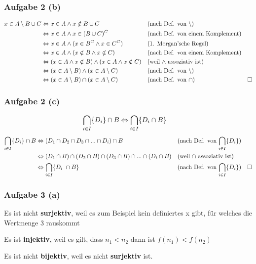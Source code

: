\documentclass[a4paper, 10pt]{scrartcl}
\begin{document}
\subsubsection*{Aufgabe 2 \small(b)}
\begin{align}
    x \in A \setminus B \cup C &\Leftrightarrow x \in A \wedge x \notin B \cup C \notag && \textrm{(nach Def. von $\setminus$)}\\
    &\Leftrightarrow x \in A \wedge x \in  (B \cup C)^C \notag  && \textrm{(nach Def. von einem Komplement)}\\
    &\Leftrightarrow x \in A \wedge (x \in B^C \wedge x \in C^C) \notag  && \textrm{(1. Morgan'sche Regel)} \\
    &\Leftrightarrow x \in A \wedge (x \notin B \wedge x \notin C) \notag  && \textrm{(nach Def. von einem Komplement)} \\
    &\Leftrightarrow (x \in A \wedge x \notin B) \wedge (x \in A \wedge x \notin C) \notag  && \textrm{(weil $\wedge$ assoziativ ist)}\\
    &\Leftrightarrow (x \in A \setminus B) \wedge (x \in A \setminus C) \notag  && \textrm{(nach Def. von $\setminus$)}\\
    &\Leftrightarrow (x \in A \setminus B) \cap (x \in A \setminus C) \notag && \textrm{(nach Def. von $\cap$)} & \Box
\end{align}

\subsubsection*{Aufgabe 2 \small(c)}
\begin{align}
    \bigcap_{i \in I}\{D_i\} \cap B &\Leftrightarrow \bigcap_{i \in I}\{D_i \cap B\} \notag 
\end{align}
\begin{align}
    \bigcap_{i \in I}\{D_i\} \cap B &\Leftrightarrow (D_1 \cap D_2 \cap D_3 \cap ... \cap D_i) \cap B \notag  && \textrm{(nach Def. von $\bigcap_{i \in I}\{D_i\}$)}\\
    &\Leftrightarrow (D_1 \cap B) \cap (D_2 \cap B) \cap (D_3 \cap B) \cap ... \cap (D_i \cap B) \notag && \textrm{(weil $\cap$ assoziativ ist)} \\
    &\Leftrightarrow  \bigcap_{i \in I}\{D_i\ \cap B\} && \textrm{(nach Def. von $\bigcap_{i \in I}\{D_i\}$)} & \Box \notag 
\end{align}

\subsubsection*{Aufgabe 3 \small(a)}
\begin{flushleft}
    Es ist nicht \textbf{surjektiv}, weil es zum Beispiel kein definiertes x gibt, für welches die Wertmenge 3 rauskommt
\end{flushleft}
\begin{flushleft}
    Es ist \textbf{injektiv}, weil es gilt, dass $n_1 < n_2$ dann ist $f(n_1) < f(n_2)$
\end{flushleft} 
\begin{flushleft}
    Es ist nicht \textbf{bijektiv}, weil es nicht \textbf{surjektiv} ist.
\end{flushleft}
\end{document}
